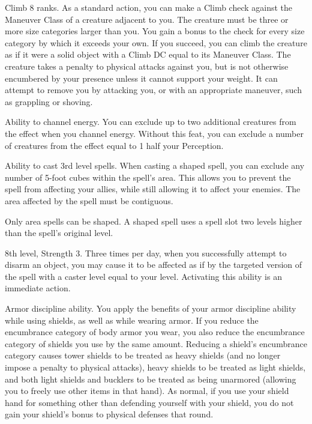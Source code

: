 \featpre Climb 8 ranks.
\featben As a standard action, you can make a Climb check against the Maneuver Class of a creature adjacent to you.
The creature must be three or more size categories larger than you.
You gain a  bonus to the check for every size category by which it exceeds your own.
If you succeed, you can climb the creature as if it were a solid object with a Climb DC equal to its Maneuver Class.
The creature takes a  penalty to physical attacks against you, but is not otherwise encumbered by your presence unless it cannot support your weight.
It can attempt to remove you by attacking you, or with an appropriate maneuver, such as grappling or shoving.

\featpres
Ability to channel energy.
\featben You can exclude up to two additional creatures from the effect when you channel energy.
Without this feat, you can exclude a number of creatures from the effect equal to 1 \add half your Perception.

\featpre Ability to cast 3rd level spells.
\featben When casting a shaped spell, you can exclude any number of 5-foot cubes within the spell's area.
This allows you to prevent the spell from affecting your allies, while still allowing it to affect your enemies.
The area affected by the spell must be contiguous.

Only area spells can be shaped.
A shaped spell uses a spell slot two levels higher than the spell's original level.

\featpres 8th level, Strength 3.
\featben Three times per day, when you successfully attempt to disarm an object, you may cause it to be affected as if by the targeted version of the 
spell with a caster level equal to your level.
Activating this ability is an immediate action.

\featpre Armor discipline ability.
\featben You apply the benefits of your armor discipline ability while using shields, as well as while wearing armor.
If you reduce the encumbrance category of body armor you wear, you also reduce the encumbrance category of shields you use by the same amount.
Reducing a shield's encumbrance category causes tower shields to be treated as heavy shields (and no longer impose a  penalty to physical attacks), heavy shields to be treated as light shields, and both light shields and bucklers to be treated as being unarmored (allowing you to freely use other items in that hand).
As normal, if you use your shield hand for something other than defending yourself with your shield, you do not gain your shield's bonus to physical defenses that round.

